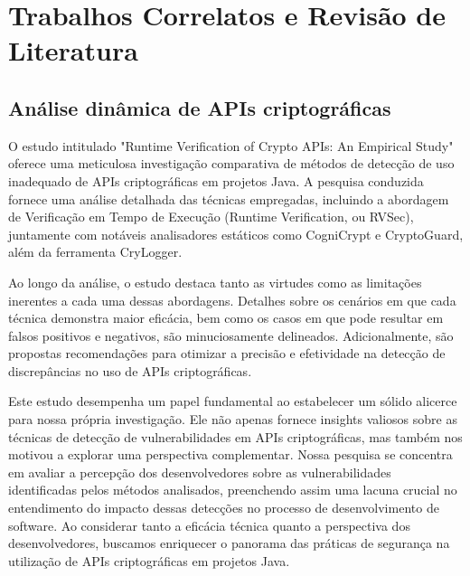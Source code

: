 \newcommand{\texCommand}[1]{\texttt{\textbackslash{#1}}}%

\newcommand{\exemplo}[1]{%
\vspace{\baselineskip}%
\noindent\fbox{\begin{minipage}{\textwidth}#1\end{minipage}}%
\\\vspace{\baselineskip}}%

\newcommand{\exemploVerbatim}[1]{%
\vspace{\baselineskip}%
\noindent\fbox{\begin{minipage}{\textwidth}%
#1\end{minipage}}%
\\\vspace{\baselineskip}}%



\section{Trabalhos Correlatos e Revisão de Literatura}

\subsection{Análise dinâmica de APIs criptográficas} %
O estudo intitulado "Runtime Verification of Crypto APIs: An Empirical Study" oferece uma meticulosa investigação comparativa de métodos de detecção de uso inadequado de APIs criptográficas em projetos Java. A pesquisa conduzida fornece uma análise detalhada das técnicas empregadas, incluindo a abordagem de Verificação em Tempo de Execução (Runtime Verification, ou RVSec), juntamente com notáveis analisadores estáticos como CogniCrypt e CryptoGuard, além da ferramenta CryLogger.

Ao longo da análise, o estudo destaca tanto as virtudes como as limitações inerentes a cada uma dessas abordagens. Detalhes sobre os cenários em que cada técnica demonstra maior eficácia, bem como os casos em que pode resultar em falsos positivos e negativos, são minuciosamente delineados. Adicionalmente, são propostas recomendações para otimizar a precisão e efetividade na detecção de discrepâncias no uso de APIs criptográficas.

Este estudo desempenha um papel fundamental ao estabelecer um sólido alicerce para nossa própria investigação. Ele não apenas fornece insights valiosos sobre as técnicas de detecção de vulnerabilidades em APIs criptográficas, mas também nos motivou a explorar uma perspectiva complementar. Nossa pesquisa se concentra em avaliar a percepção dos desenvolvedores sobre as vulnerabilidades identificadas pelos métodos analisados, preenchendo assim uma lacuna crucial no entendimento do impacto dessas detecções no processo de desenvolvimento de software. Ao considerar tanto a eficácia técnica quanto a perspectiva dos desenvolvedores, buscamos enriquecer o panorama das práticas de segurança na utilização de APIs criptográficas em projetos Java.

